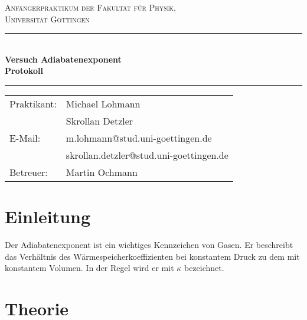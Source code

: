 \documentclass[12pt,a4paper,titlepage,headinclude,bibtotoc]{scrartcl}
\begin{document}
\begin{titlepage}
\centering
\textsc{\Large Anfängerpraktikum der Fakultät für
  Physik,\\[1.5ex] Universität Göttingen}

\vspace*{4.2cm}

\rule{\textwidth}{1pt}\\[0.5cm]
{\huge \bfseries
  Versuch Adiabatenexponent\\[1.5ex]
  Protokoll}\\[0.5cm]
\rule{\textwidth}{1pt}

\vspace*{3cm}

\begin{Large}
\begin{tabular}{ll}
Praktikant: &  Michael Lohmann\\
& Skrollan Detzler\\
E-Mail: & m.lohmann@stud.uni-goettingen.de\\
 & skrollan.detzler@stud.uni-goettingen.de\\
Betreuer: & Martin Ochmann\\
\end{tabular}
\end{Large}

\vspace*{0.8cm}

\begin{Large}
\end{Large}

\end{titlepage}

\tableofcontents

\newpage

\section{Einleitung}
\label{sec:einleitung}
Der Adiabatenexponent ist ein wichtiges Kennzeichen von Gasen.
Er beschreibt das Verhältnis des Wärmespeicherkoeffizienten bei konstantem Druck zu dem mit konstantem Volumen.
In der Regel wird er mit $\kappa$ bezeichnet.

\section{Theorie}
\label{sec:theorie}
                                                                                                                                                                      
\end{document}
